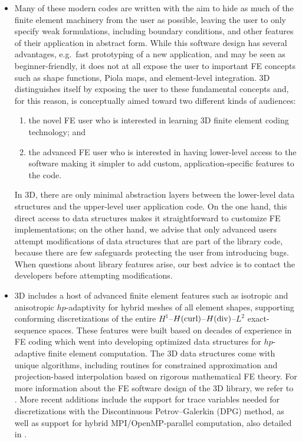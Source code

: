 \begin{itemize}
\item Many of these modern codes are written with the aim to hide as much of the finite element machinery from the user as possible, leaving the user to only specify weak formulations, including boundary conditions, and other features of their application in abstract form. While this software design has several advantages, e.g.~fast prototyping of a new application, and may be seen as beginner-friendly, it does not at all expose the user to important FE concepts such as shape functions, Piola maps, and element-level integration. \hp3D distinguishes itself by exposing the user to these fundamental concepts and, for this reason, is conceptually aimed toward two different kinds of audiences:
\begin{enumerate}
	\item the novel FE user who is interested in learning 3D finite element coding technology; and 
	\item the advanced FE user who is interested in having lower-level access to the software making it simpler to add custom, application-specific features to the code. 
\end{enumerate}
In \hp3D, there are only minimal abstraction layers between the lower-level data structures and the upper-level user application code. On the one hand, this direct access to data structures makes it straightforward to customize FE implementations; on the other hand, we advise that only advanced users attempt modifications of data structures that are part of the library code, because there are few safeguards protecting the user from introducing bugs. When questions about library features arise, our best advice is to contact the developers before attempting modifications.

\item \hp3D includes a host of advanced finite element features such as isotropic and anisotropic $hp$-adaptivity for hybrid meshes of all element shapes, supporting conforming discretizations of the entire $H^1$--$H(\text{curl})$--$H(\text{div})$--$L^2$ exact-sequence spaces. These features were built based on decades of experience in FE coding which went into developing optimized data structures for $hp$-adaptive finite element computation. The \hp3D data structures come with unique algorithms, including routines for constrained approximation and projection-based interpolation based on rigorous mathematical FE theory. For more information about the FE software design of the \hp3D library, we refer to \cite{hpbook2,hpbook3}. More recent additions include the support for trace variables needed for discretizations with the Discontinuous Petrov--Galerkin (DPG) method, as well as support for hybrid MPI/OpenMP-parallel computation, also detailed in \cite{hpbook3}.


\end{itemize}
